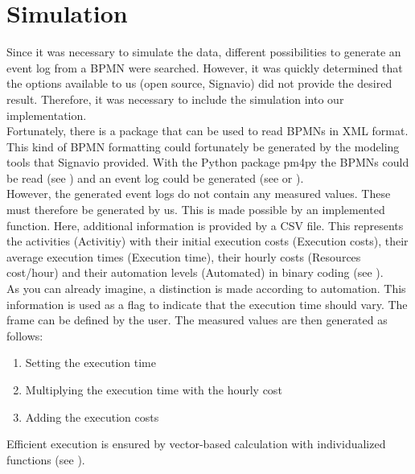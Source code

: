     \section{Simulation}
    Since it was necessary to simulate the data, different possibilities to generate an event log from a BPMN were searched. However, it was quickly determined that the options available to us (open source, Signavio) did not provide the desired result. Therefore, it was necessary to include the simulation into our implementation.\\
    Fortunately, there is a package that can be used to read BPMNs in XML format. This kind of BPMN formatting could fortunately be generated by the modeling tools that Signavio provided. With the Python package pm4py the BPMNs could be read (see ) and an event log could be generated (see  or ).\\
    However, the generated event logs do not contain any measured values. These must therefore be generated by us. This is made possible by an implemented function. Here, additional information is provided by a CSV file. This represents the activities (Activitiy) with their initial execution costs (Execution costs), their average execution times (Execution time), their hourly costs (Resources cost/hour) and their automation levels (Automated) in binary coding (see ).\\
    As you can already imagine, a distinction is made according to automation. This information is used as a flag to indicate that the execution time should vary. The frame can be defined by the user. The measured values are then generated as follows:
    \begin{enumerate}
        \item Setting the execution time
        \item Multiplying the execution time with the hourly cost
        \item Adding the execution costs
    \end{enumerate}
    Efficient execution is ensured by vector-based calculation with individualized functions (see ).

